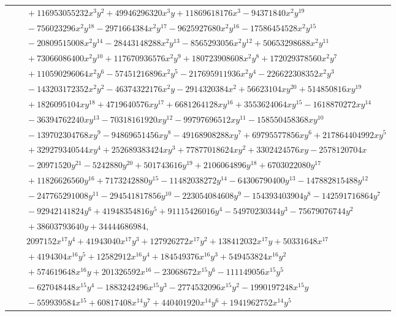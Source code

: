 \documentclass[11pt]{article}
\begin{document}
\begin{longtable}{@{}ll@{}}
 & $\quad +116953055232x^{3}y^{2}+49946296320x^{3}y+11869618176x^{3}-94371840x^{2}y^{19}$\\
 & $\quad -756023296x^{2}y^{18}-2971664384x^{2}y^{17}-9625927680x^{2}y^{16}-17586454528x^{2}y^{15}$\\
 & $\quad -20809515008x^{2}y^{14}-28443148288x^{2}y^{13}-8565293056x^{2}y^{12}+50653298688x^{2}y^{11}$\\
 & $\quad +73066086400x^{2}y^{10}+117670936576x^{2}y^{9}+180723908608x^{2}y^{8}+172029378560x^{2}y^{7}$\\
 & $\quad +110590296064x^{2}y^{6}-57451216896x^{2}y^{5}-217695911936x^{2}y^{4}-226622308352x^{2}y^{3}$\\
 & $\quad -143203172352x^{2}y^{2}-46374322176x^{2}y-2914320384x^{2}+56623104xy^{20}+514850816xy^{19}$\\
 & $\quad +1826095104xy^{18}+4719640576xy^{17}+6681264128xy^{16}+3553624064xy^{15}-1618870272xy^{14}$\\
 & $\quad -36394762240xy^{13}-70318161920xy^{12}-99797696512xy^{11}-158550458368xy^{10}$\\
 & $\quad -139702304768xy^{9}-94869651456xy^{8}-49168908288xy^{7}+69795577856xy^{6}+217864404992xy^{5}$\\
 & $\quad +329279340544xy^{4}+252689383424xy^{3}+77877018624xy^{2}+3302424576xy-2578120704x$\\
 & $\quad -20971520y^{21}-5242880y^{20}+501743616y^{19}+2106064896y^{18}+6703022080y^{17}$\\
 & $\quad +11826626560y^{16}+7173242880y^{15}-11482038272y^{14}-64306790400y^{13}-147882815488y^{12}$\\
 & $\quad -247765291008y^{11}-294541817856y^{10}-223054084608y^{9}-154393403904y^{8}-142591716864y^{7}$\\
 & $\quad -92942141824y^{6}+41948354816y^{5}+91115426016y^{4}-54970230344y^{3}-75679076744y^{2}$\\
 & $\quad +38603793640y+34444686984,$\\
 & $\quad 2097152x^{17}y^{4}+41943040x^{17}y^{3}+127926272x^{17}y^{2}+138412032x^{17}y+50331648x^{17}$\\
 & $\quad +4194304x^{16}y^{5}+12582912x^{16}y^{4}+184549376x^{16}y^{3}+549453824x^{16}y^{2}$\\
 & $\quad +574619648x^{16}y+201326592x^{16}-23068672x^{15}y^{6}-111149056x^{15}y^{5}$\\
 & $\quad -627048448x^{15}y^{4}-1883242496x^{15}y^{3}-2774532096x^{15}y^{2}-1990197248x^{15}y$\\
 & $\quad -559939584x^{15}+60817408x^{14}y^{7}+440401920x^{14}y^{6}+1941962752x^{14}y^{5}$\\

\end{longtable}
\end{document}
